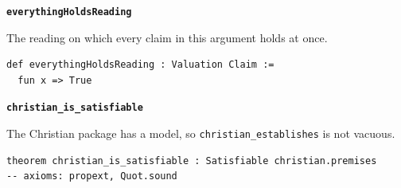\documentclass[11pt]{article}
\begin{document}
\par\medskip\noindent\textbf{\texttt{everything\allowbreak{}Holds\allowbreak{}Reading}}\par\nobreak\noindent
The reading on which every claim in this argument holds at once.

{\small\begin{verbatim}
def everythingHoldsReading : Valuation Claim :=
  fun x => True
\end{verbatim}}
\par\medskip\noindent\textbf{\texttt{christian\_\allowbreak{}is\_\allowbreak{}satisfiable}}\par\nobreak\noindent
The Christian package has a model, so \texttt{christian\_\allowbreak{}establishes} is not vacuous.

{\small\begin{verbatim}
theorem christian_is_satisfiable : Satisfiable christian.premises
-- axioms: propext, Quot.sound
\end{verbatim}}



\end{document}
